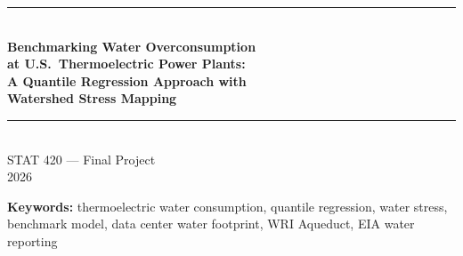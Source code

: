 \documentclass[11pt, letterpaper]{article}
\begin{document}
\begin{titlepage}
  \centering
  \vspace*{2cm}
  {\color{navyblue}\rule{\linewidth}{1.5pt}}\\[0.4cm]
  {\LARGE\bfseries\color{navyblue}
    Benchmarking Water Overconsumption\\[0.3em]
    at U.S.\ Thermoelectric Power Plants:\\[0.3em]
    A Quantile Regression Approach with\\[0.3em]
    Watershed Stress Mapping
  }\\[0.4cm]
  {\color{navyblue}\rule{\linewidth}{1.5pt}}\\[1.5cm]
  {\large\color{steelblue} STAT 420 --- Final Project}\\[0.4cm]
  {\large 2026}\\[3cm]
  \begin{mdframed}[style=abstractbox]
    \textbf{\color{navyblue}Keywords:} thermoelectric water consumption,
    quantile regression, water stress, benchmark model,
    data center water footprint, WRI Aqueduct,
    EIA water reporting
  \end{mdframed}
  \vfill
\end{titlepage}

\end{document}
